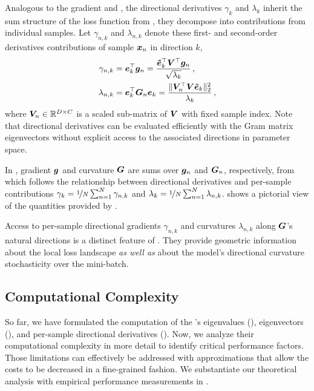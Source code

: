 Analogous to the gradient and \ggn, the directional derivatives $\gamma_k$ and
$\lambda_k$ inherit the sum structure of the loss function from
, \ie they decompose into contributions from
individual samples. Let $\gamma_{n,k}$ and $\lambda_{n,k}$ denote these first- and
second-order derivatives contributions of sample ${\bm{x}}_n$ in direction $k$, \ie
\begin{subequations}
  \label{vivit::eq:gammas-lambdas}
  \begin{align}
    \label{vivit::eq:gammas}
    \gamma_{n,k}
    &= {\bm{e}}_k^\top {\bm{g}}_n
      = \frac{\bm{\tilde{e}}_k^\top {\bm{V}}^\top {\bm{g}}_n}{\sqrt{\lambda_k}}\,,
    \\
    \label{vivit::eq:lambdas}
    \lambda_{n,k}
    &= {\bm{e}}_k^\top {\bm{G}}_n {\bm{e}}_k
      = \frac{\lVert {\bm{V}}_n^\top {\bm{V}} \bm{\tilde{e}}_k \rVert^2_2}{\lambda_k}\,,
  \end{align}
\end{subequations}
where ${\bm{V}}_n \in {\mathbb{R}}^{D \times C}$ is
a scaled sub-matrix of ${\bm{V}}$ with fixed sample index. Note that directional
derivatives can be evaluated efficiently with the Gram matrix eigenvectors
without explicit access to the associated directions in parameter space.

In , gradient ${\bm{g}}$ and curvature ${\bm{G}}$ are
sums over ${\bm{g}}_n$ and ${\bm{G}}_n$, respectively, from which follows the relationship
between directional derivatives and per-sample contributions $\gamma_k =
\nicefrac{1}{N}\sum_{n=1}^N\gamma_{n,k}$ and $\lambda_k = \nicefrac{1}{N}
\sum_{n=1}^N\lambda_{n,k}$.  shows a pictorial view of
the quantities provided by \vivit.

Access to per-sample directional gradients $\gamma_{n,k}$ and curvatures
$\lambda_{n,k}$ along ${\bm{G}}$'s natural directions is a distinct feature of
\vivit. They provide geometric information about the local loss landscape
\emph{as well as} about the model's directional curvature stochasticity over the
mini-batch.
\subsection{Computational Complexity}
\label{vivit::sec:method-complexity}
So far, we have formulated the computation of the \ggn{}'s eigenvalues
(), eigenvectors
(), and per-sample directional derivatives
(). Now, we analyze their computational complexity in
more detail to identify critical performance factors. Those limitations can
effectively be addressed with approximations that allow the costs to be
decreased in a fine-grained fashion. We substantiate our theoretical analysis
with empirical performance measurements in .

